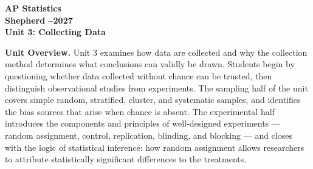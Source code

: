 \documentclass[10pt]{article}
\begin{document}
\vspace{-1.3in}

\begin{center}
  {\color{white}\bfseries\fontsize{28}{34}\selectfont AP Statistics}\\[8pt]
  {\color{goldacc}\bfseries\Large Shepherd --2027}\\[14pt]
  {\color{white}\bfseries\LARGE Unit 3: Collecting Data}\\[4pt]
\end{center}

\vspace{0.30in}

\begin{tcolorbox}[colback=sky,colframe=navy,boxrule=0.9pt,arc=2mm,
    left=4mm,right=4mm,top=3mm,bottom=3mm]
  \textbf{Unit Overview.}\quad
  Unit 3 examines how data are collected and why the collection method determines
  what conclusions can validly be drawn.  Students begin by questioning whether data
  collected without chance can be trusted, then distinguish observational studies from
  experiments.  The sampling half of the unit covers simple random, stratified, cluster,
  and systematic samples, and identifies the bias sources that arise when chance is
  absent.  The experimental half introduces the components and principles of
  well-designed experiments --- random assignment, control, replication, blinding, and
  blocking --- and closes with the logic of statistical inference: how random assignment
  allows researchers to attribute statistically significant differences to the treatments.
\end{tcolorbox}

\vspace{0.22in}
\end{document}
